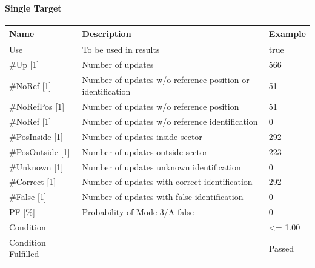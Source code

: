 \paragraph{Single Target}

\begin{center}
 \begin{table}[H]
  \begin{tabularx}{\textwidth}{ | l | X |  l | }
    \hline
    \textbf{Name} & \textbf{Description} & \textbf{Example} \\ \hline
    Use & To be used in results & true \\ \hline
    \#Up [1] & Number of updates & 566 \\ \hline
    \#NoRef [1] & Number of updates w/o reference position or identification & 51 \\ \hline
    \#NoRefPos [1] & Number of updates w/o reference position  & 51 \\ \hline
    \#NoRef [1] & Number of updates w/o reference identification & 0 \\ \hline
    \#PosInside [1] & Number of updates inside sector & 292 \\ \hline
    \#PosOutside [1] & Number of updates outside sector & 223 \\ \hline
    \#Unknown [1] & Number of updates unknown identification & 0 \\ \hline
    \#Correct [1] & Number of updates with correct identification & 292 \\ \hline
    \#False [1] & Number of updates with false identification & 0 \\ \hline
    PF [\%] & Probability of Mode 3/A false & 0 \\ \hline
    Condition &  & <= 1.00 \\ \hline
    Condition Fulfilled &  & Passed \\ \hline
\end{tabularx}
\end{table}
\end{center}
